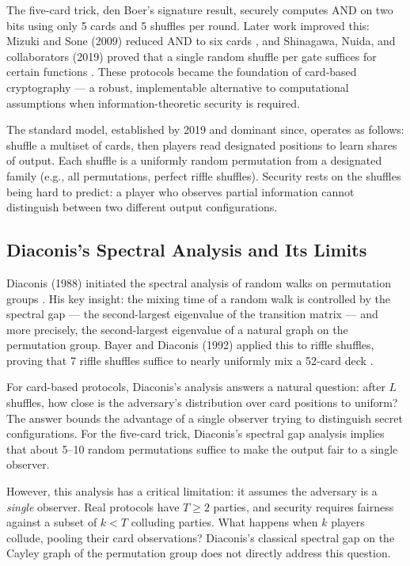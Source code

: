 \documentclass[11pt,a4paper]{article}
\begin{document}
The five-card trick, den Boer's signature result, securely computes AND on two bits using only 5 cards and 5 shuffles per round.
Later work improved this: Mizuki and Sone (2009) reduced AND to six cards \cite{mizukiSone2009}, and Shinagawa, Nuida, and collaborators (2019) proved that a single random shuffle per gate suffices for certain functions \cite{shinagawaNuida2019}.
These protocols became the foundation of card-based cryptography — a robust, implementable alternative to computational assumptions when information-theoretic security is required.

The standard model, established by 2019 and dominant since, operates as follows: shuffle a multiset of cards, then players read designated positions to learn shares of output.
Each shuffle is a uniformly random permutation from a designated family (e.g., all permutations, perfect riffle shuffles).
Security rests on the shuffles being hard to predict: a player who observes partial information cannot distinguish between two different output configurations.

\subsection*{Diaconis's Spectral Analysis and Its Limits}

Diaconis (1988) initiated the spectral analysis of random walks on permutation groups \cite{diaconis1988}.
His key insight: the mixing time of a random walk is controlled by the spectral gap — the second-largest eigenvalue of the transition matrix — and more precisely, the second-largest eigenvalue of a natural graph on the permutation group.
Bayer and Diaconis (1992) applied this to riffle shuffles, proving that 7 riffle shuffles suffice to nearly uniformly mix a 52-card deck \cite{bayerDiaconis1992}.

For card-based protocols, Diaconis's analysis answers a natural question: after $L$ shuffles, how close is the adversary's distribution over card positions to uniform?
The answer bounds the advantage of a single observer trying to distinguish secret configurations.
For the five-card trick, Diaconis's spectral gap analysis implies that about 5--10 random permutations suffice to make the output fair to a single observer.

However, this analysis has a critical limitation: it assumes the adversary is a \emph{single} observer.
Real protocols have $T \geq 2$ parties, and security requires fairness against a subset of $k < T$ colluding parties.
What happens when $k$ players collude, pooling their card observations?
Diaconis's classical spectral gap on the Cayley graph of the permutation group does not directly address this question.
\end{document}
